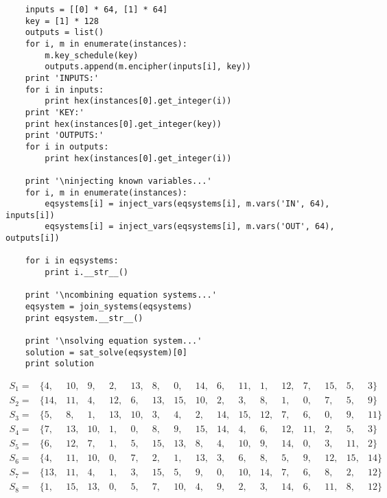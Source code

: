 \begin{lstlisting}
    inputs = [[0] * 64, [1] * 64]
    key = [1] * 128
    outputs = list()
    for i, m in enumerate(instances):
        m.key_schedule(key)
        outputs.append(m.encipher(inputs[i], key))
    print 'INPUTS:'
    for i in inputs:
        print hex(instances[0].get_integer(i))
    print 'KEY:'
    print hex(instances[0].get_integer(key))
    print 'OUTPUTS:'
    for i in outputs:
        print hex(instances[0].get_integer(i))

    print '\ninjecting known variables...'
    for i, m in enumerate(instances):
        eqsystems[i] = inject_vars(eqsystems[i], m.vars('IN', 64), inputs[i])
        eqsystems[i] = inject_vars(eqsystems[i], m.vars('OUT', 64), outputs[i])

    for i in eqsystems:
        print i.__str__()

    print '\ncombining equation systems...'
    eqsystem = join_systems(eqsystems)
    print eqsystem.__str__()

    print '\nsolving equation system...'
    solution = sat_solve(eqsystem)[0]
    print solution

\end{lstlisting}

\label{app:gost-sboxes}

\begin{equation}
    \nonumber
    \begin{array}{lllllllllllllllll}
        S_1 =&  \{4, &  10, &  9, &  2, &  13, &  8, &  0, &  14, &  6, &  11, &  1, &  12, &  7, &  15, &  5, &  3 \} \\
        S_2 =&  \{14, &  11, &  4, &  12, &  6, &  13, &  15, &  10, &  2, &  3, &  8, &  1, &  0, &  7, &  5, &  9 \} \\
        S_3 =&  \{5, &  8, &  1, &  13, &  10, &  3, &  4, &  2, &  14, &  15, &  12, &  7, &  6, &  0, &  9, &  11 \} \\
        S_4 =&  \{7, &  13, &  10, &  1, &  0, &  8, &  9, &  15, &  14, &  4, &  6, &  12, &  11, &  2, &  5, &  3 \} \\
        S_5 =&  \{6, &  12, &  7, &  1, &  5, &  15, &  13, &  8, &  4, &  10, &  9, &  14, &  0, &  3, &  11, &  2 \} \\
        S_6 =&  \{4, &  11, &  10, &  0, &  7, &  2, &  1, &  13, &  3, &  6, &  8, &  5, &  9, &  12, &  15, &  14 \} \\
        S_7 =&  \{13, &  11, &  4, &  1, &  3, &  15, &  5, &  9, &  0, &  10, &  14, &  7, &  6, &  8, &  2, &  12 \} \\
        S_8 =&  \{1, &  15, &  13, &  0, &  5, &  7, &  10, &  4, &  9, &  2, &  3, &  14, &  6, &  11, &  8, &  12 \}
    \end{array}
\end{equation}

